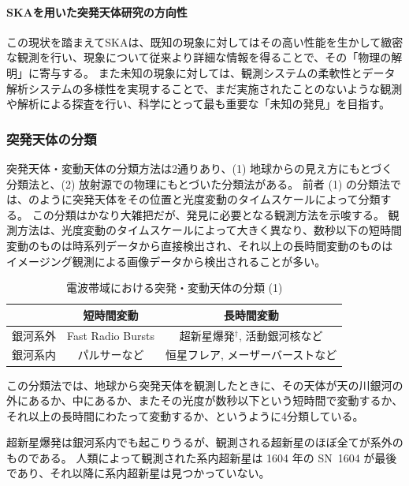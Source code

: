 \paragraph{SKAを用いた突発天体研究の方向性}
この現状を踏まえてSKAは、既知の現象に対してはその高い性能を生かして緻密な観測を行い、現象について従来より詳細な情報を得ることで、その「物理の解明」に寄与する。
また未知の現象に対しては、観測システムの柔軟性とデータ解析システムの多様性を実現することで、まだ実施されたことのないような観測や解析による探査を行い、科学にとって最も重要な「未知の発見」を目指す。

\subsubsection{突発天体の分類}
突発天体・変動天体の分類方法は2通りあり、(1) 地球からの見え方にもとづく分類法と、(2) 放射源での物理にもとづいた分類法がある。
前者 (1) の分類法では、のように突発天体をその位置と光度変動のタイムスケールによって分類する\citep{2012ApJ...747...70F}。
この分類はかなり大雑把だが、発見に必要となる観測方法を示唆する。
観測方法は、光度変動のタイムスケールによって大きく異なり、数秒以下の短時間変動のものは時系列データから直接検出され、それ以上の長時間変動のものはイメージング観測による画像データから検出されることが多い。
\begin{table}
	\centering
	\caption{電波帯域における突発・変動天体の分類 (1)}\label{tb:frail-classification}
	\begin{tabular}{|c|c|c|}
		\hline
		&
		{\gt 短時間変動} &
		{\gt 長時間変動} \\ \hline

		{\gt 銀河系外}	&
		Fast Radio Bursts &
		超新星爆発$^\dagger$, 活動銀河核など \\ \hline
		
		{\gt 銀河系内}	&
		パルサーなど &
		恒星フレア, メーザーバーストなど \\ \hline		
	\end{tabular}
	\begin{tablenotes}
	この分類法では、地球から突発天体を観測したときに、その天体が天の川銀河の外にあるか、中にあるか、またその光度が数秒以下という短時間で変動するか、それ以上の長時間にわたって変動するか、というように4分類している。
	\end{tablenotes}
	\begin{tablecomments}{\dagger}
	超新星爆発は銀河系内でも起こりうるが、観測される超新星のほぼ全てが系外のものである。
	人類によって観測された系内超新星は 1604 年の SN~1604 が最後であり、それ以降に系内超新星は見つかっていない。
	\end{tablecomments}
\end{table}%

